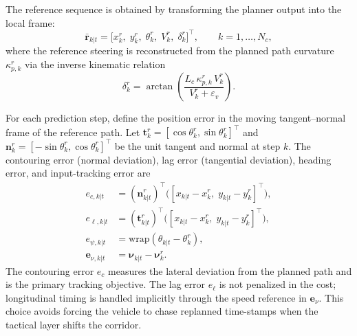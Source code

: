 \documentclass{iopjournal}
\begin{document}
The reference sequence is obtained by transforming the planner output into
the local frame:
\begin{equation}
\bar{\bm{r}}_{k|t}=
\bigl[x_{k}^{r},\;y_{k}^{r},\;\theta_{k}^{r},\;V_{k}^{r},\;
\delta_{k}^{r}\bigr]^\top,
\qquad k=1,\ldots,N_c,
\label{eq:mpcc_ref}
\end{equation}
where the reference steering is reconstructed from the planned path curvature
$\kappa_{p,k}^r$ via the inverse kinematic relation
\begin{equation}
\delta_{k}^{r}=
\arctan\!\left(\frac{L_c\,\kappa_{p,k}^r\,V_k^r}
{V_k^r+\varepsilon_v}\right).
\label{eq:steer_ff}
\end{equation}

For each prediction step, define the position error in the moving
tangent--normal frame of the reference path.  Let
$\bm{t}_k^r=[\cos\theta_k^r,\sin\theta_k^r]^\top$ and
$\bm{n}_k^r=[-\sin\theta_k^r,\cos\theta_k^r]^\top$ be the unit tangent
and normal at step $k$.  The contouring error (normal deviation), lag error
(tangential deviation), heading error, and input-tracking error are
\begin{align}
e_{c,k|t} &=(\bm{n}_{k|t}^{r})^\top
\bigl([x_{k|t}-x_{k}^{r},\;y_{k|t}-y_{k}^{r}]^\top\bigr),
\label{eq:mpcc_ec}\\
e_{\ell,k|t} &=(\bm{t}_{k|t}^{r})^\top
\bigl([x_{k|t}-x_{k}^{r},\;y_{k|t}-y_{k}^{r}]^\top\bigr),
\label{eq:mpcc_el}\\
e_{\psi,k|t} &=\mathrm{wrap}(\theta_{k|t}-\theta_{k}^{r}),
\label{eq:mpcc_epsi}\\
\bm{e}_{\nu,k|t} &=\bm{\nu}_{k|t}-\bm{\nu}_{k}^{r}.
\label{eq:mpcc_enu}
\end{align}
The contouring error $e_c$ measures the lateral deviation from the planned
path and is the primary tracking objective.  The lag error $e_\ell$ is not
penalized in the cost; longitudinal timing is handled implicitly through
the speed reference in $\bm{e}_\nu$.  This choice avoids forcing the
vehicle to chase replanned time-stamps when the tactical layer shifts the
corridor.
\end{document}
